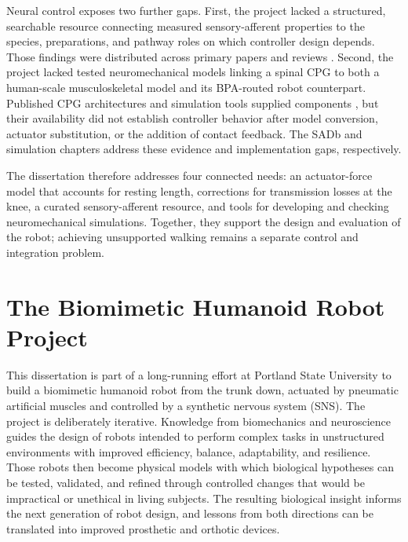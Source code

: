Neural control exposes two further gaps. First, the project lacked a structured, searchable resource connecting measured sensory-afferent properties to the species, preparations, and pathway roles on which controller design depends. Those findings were distributed across primary papers and reviews \citep{van_de_crommert_review_1998, windhorst_muscle_2007, windhorst_spinal_2022}. Second, the project lacked tested neuromechanical models linking a spinal CPG to both a human-scale musculoskeletal model and its BPA-routed robot counterpart. Published CPG architectures and simulation tools supplied components \citep{rybak_modelling_2006, mccrea_organization_2008, markin_afferent_2010, nourse_sns_2023}, but their availability did not establish controller behavior after model conversion, actuator substitution, or the addition of contact feedback. The SADb and simulation chapters address these evidence and implementation gaps, respectively.

The dissertation therefore addresses four connected needs: an actuator-force model that accounts for resting length, corrections for transmission losses at the knee, a curated sensory-afferent resource, and tools for developing and checking neuromechanical simulations. Together, they support the design and evaluation of the robot; achieving unsupported walking remains a separate control and integration problem.

\section{The Biomimetic Humanoid Robot Project}\label{sec:project}

This dissertation is part of a long-running effort at Portland State University to build a biomimetic humanoid robot from the trunk down, actuated by pneumatic artificial muscles and controlled by a synthetic nervous system (SNS). The project is deliberately iterative. Knowledge from biomechanics and neuroscience guides the design of robots intended to perform complex tasks in unstructured environments with improved efficiency, balance, adaptability, and resilience. Those robots then become physical models with which biological hypotheses can be tested, validated, and refined through controlled changes that would be impractical or unethical in living subjects. The resulting biological insight informs the next generation of robot design, and lessons from both directions can be translated into improved prosthetic and orthotic devices.

